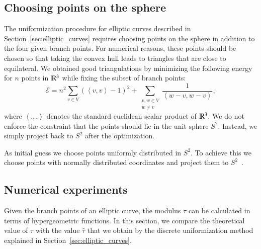\documentclass[Thesis]{subfiles}
\begin{document}
\subsection{Choosing points on the sphere}
\label{sec:spherical_triangulations}

The uniformization procedure for elliptic curves described in
Section~\ref{sec:elliptic_curves} requires choosing points on the
sphere in addition to the four given branch points. For numerical
reasons, these points should be chosen so that taking the convex hull
leads to triangles that are close to equilateral. We obtained good
triangulations by minimizing the following energy for $n$ points in
$\mathbb R^{3}$ while fixing the subset of branch points:
\begin{equation}
\mathcal E = n^2\sum_{v\in V}\left( \left<v,v\right> - 1\right)^2 +
\sum_{\substack{v,w\in V\\w\neq v}} \frac{1}{\left<w-v,
    w-v\right>},
\end{equation}
where $\left<.,.\right>$ denotes the standard euclidean scalar product
of $\mathbb R^{3}$. We do not enforce the constraint that the points should
lie in the unit sphere $S^{2}$. Instead, we simply project back to $S^{2}$
after the optimization.

As initial guess we choose points uniformly distributed in $S^{2}$. To
achieve this we choose points with normally distributed coordinates
and project them to $S^2$~\cite{Muller1959}.


\subsection{Numerical experiments}
\label{sec:numerical_convergence}

Given the branch points of an elliptic curve, the
modulus $\tau$ can be calculated in terms of hypergeometric
functions. In this section, we compare the theoretical value of $\tau$
with the value $\hat\tau$ that we obtain by the discrete uniformization
method explained in Section~\ref{sec:elliptic_curves}.

\end{document}
